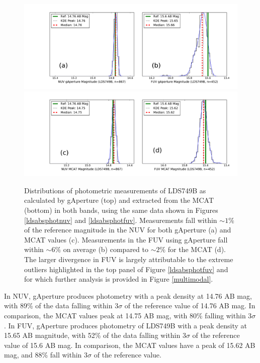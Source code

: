 \documentclass[preprint]{aastex}
\begin{document}
\begin{figure}[h]
\includegraphics[scale=0.45]{Fig08a.pdf}\\
\includegraphics[scale=0.45]{Fig08b.pdf}
\caption{Distributions of photometric measurements of LDS749B as calculated by gAperture (top) and extracted from the MCAT (bottom) in both bands, using the same data shown in Figures \ref{ldsabsphotnuv} and \ref{ldsabsphotfuv}. Measurements fall within $\sim1\%$ of the reference magnitude in the NUV for both gAperture (a) and MCAT values (c). Measurements in the FUV using gAperture fall within $\sim6\%$ on average (b) compared to $\sim2\%$ for the MCAT (d). The larger divergence in FUV is largely attributable to the extreme outliers highlighted in the top panel of Figure \ref{ldsabsphotfuv} and for which further analysis is provided in Figure \ref{multimodal}.
\label{magdist}}
\end{figure}
\clearpage

In NUV, gAperture produces photometry with a peak density at 14.76 AB mag, with 89\% of the data falling within 3$\sigma$ of the reference value of 14.76 AB mag. In comparison, the MCAT values peak at 14.75 AB mag, with 80\% falling within 3$\sigma$. In FUV, gAperture produces photometry of LDS749B with a peak density at 15.65 AB magnitude, with 52\% of the data falling within 3$\sigma$ of the reference value of 15.6 AB mag. In comparison, the MCAT values have a peak of 15.62 AB mag, and 88\% fall within 3$\sigma$ of the reference value.
\end{document}
